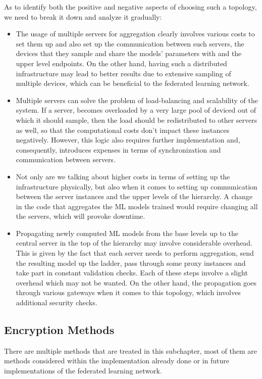 \documentclass[conference]{IEEEtran}
\begin{document}
As to identify both the positive and negative aspects of choosing such a topology, we need to break it down and analyze it gradually:
\begin{itemize}
    \item The usage of multiple servers for aggregation clearly involves various costs to set them up and also set up the communication between such servers, the devices that they sample and share the models' parameters with and the upper level endpoints. On the other hand, having such a distributed infrastructure may lead to better results due to extensive sampling of multiple devices, which can be beneficial to the federated learning network.
    \item Multiple servers can solve the problem of load-balancing and scalability of the system. If a server, becomes overloaded by a very large pool of deviced out of which it should sample, then the load should be redistributed to other servers as well, so that the computational costs don't impact these instances negatively. However, this logic also requires further implementation and, consequently, introduces expenses in terms of synchronization and communication between servers.
    \item Not only are we talking about higher costs in terms of setting up the infrastructure physically, but also when it comes to setting up communication between the server instances and the upper levels of the hierarchy. A change in the code that aggregates the ML models trained would require changing all the servers, which will provoke downtime.
    \item Propagating newly computed ML models from the base levels up to the central server in the top of the hierarchy may involve considerable overhead. This is given by the fact that each server needs to perform aggregation, send the resulting model up the ladder, pass through some proxy instances and take part in constant validation checks. Each of these steps involve a slight overhead which may not be wanted. On the other hand, the propagation goes through various gateways when it comes to this topology, which involves additional security checks.
\end{itemize}

\subsection{Encryption Methods}

There are multiple methods that are treated in this subchapter, most of them are methods considered within the implementation already done or in future implementations of the federated learning network.
\end{document}
